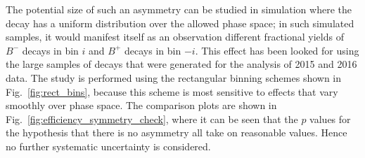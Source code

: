 The potential size of such an asymmetry can be studied in simulation where the \D decay has a uniform distribution over the allowed phase space; in such simulated samples, it would manifest itself as an observation different fractional yields 
of $B^-$ decays in bin $i$ and $B^+$ decays in bin $-i$. This effect has been looked for using the large samples of \BtoDpi decays that were generated for the analysis of 2015 and 2016 data. The study is performed using the rectangular binning schemes shown in Fig.~\ref{fig:rect_bins}, because this scheme is most sensitive to effects that vary smoothly over phase space. The comparison plots are shown in Fig.~\ref{fig:efficiency_symmetry_check}, where it can be seen that the $p$ values for the hypothesis that there is no asymmetry all take on reasonable values. Hence no further systematic uncertainty is considered.

